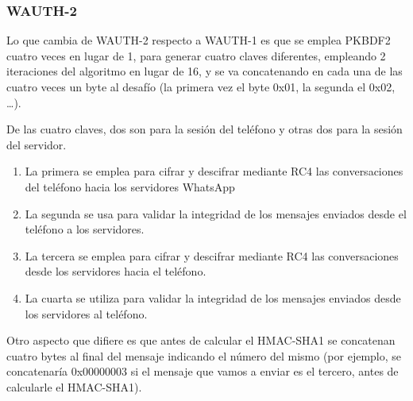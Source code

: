 \documentclass[a4paper, 11pt]{article} %
\begin{document}
\subsubsection{WAUTH-2}
Lo que cambia de WAUTH-2 respecto a WAUTH-1 es que se emplea PKBDF2 cuatro veces en lugar de 1, para generar cuatro
claves diferentes, empleando 2 iteraciones del algoritmo en lugar de 16, y se va concatenando en cada una de las
cuatro veces un byte al desafío (la primera vez el byte 0x01, la segunda el 0x02, \ldots).

De las cuatro claves, dos son para la sesión del teléfono y otras dos para la sesión del servidor.
\begin{enumerate}
 \item La primera se emplea para cifrar y descifrar mediante RC4 las conversaciones del teléfono hacia los servidores
  WhatsApp
 \item La segunda se usa para validar la integridad de los mensajes enviados desde el teléfono a los servidores.
 \item La tercera se emplea para cifrar y descifrar mediante RC4 las conversaciones desde los servidores hacia el 
  teléfono.
 \item La cuarta se utiliza para validar la integridad de los mensajes enviados desde los servidores al teléfono.
\end{enumerate}

Otro aspecto que difiere es que antes de calcular el HMAC-SHA1 se concatenan cuatro bytes al final del mensaje indicando
el número del mismo (por ejemplo, se concatenaría 0x00000003 si  el mensaje que vamos a enviar es el tercero, antes
de calcularle el HMAC-SHA1).
\end{document}
